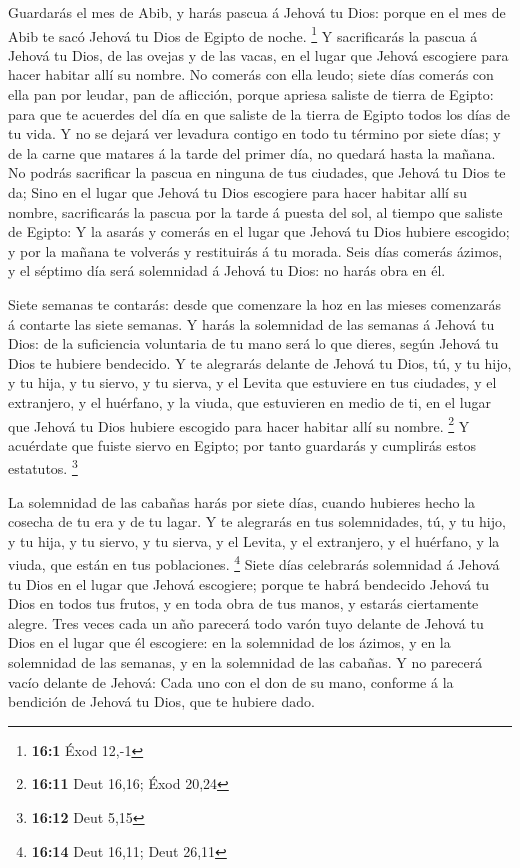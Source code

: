  Guardarás el mes de Abib, y harás pascua á Jehová tu Dios:
porque en el mes de Abib te sacó Jehová tu Dios de Egipto de noche.
\footnote{\textbf{16:1} Éxod 12,-1}  Y sacrificarás la
pascua á Jehová tu Dios, de las ovejas y de las vacas, en el lugar que
Jehová escogiere para hacer habitar allí su nombre.  No
comerás con ella leudo; siete días comerás con ella pan por leudar, pan
de aflicción, porque apriesa saliste de tierra de Egipto: para que te
acuerdes del día en que saliste de la tierra de Egipto todos los días de
tu vida.  Y no se dejará ver levadura contigo en todo tu
término por siete días; y de la carne que matares á la tarde del primer
día, no quedará hasta la mañana.  No podrás sacrificar la
pascua en ninguna de tus ciudades, que Jehová tu Dios te da;
 Sino en el lugar que Jehová tu Dios escogiere para hacer
habitar allí su nombre, sacrificarás la pascua por la tarde á puesta del
sol, al tiempo que saliste de Egipto:  Y la asarás y comerás
en el lugar que Jehová tu Dios hubiere escogido; y por la mañana te
volverás y restituirás á tu morada.  Seis días comerás
ázimos, y el séptimo día será solemnidad á Jehová tu Dios: no harás obra
en él.

 Siete semanas te contarás: desde que comenzare la hoz en
las mieses comenzarás á contarte las siete semanas.  Y
harás la solemnidad de las semanas á Jehová tu Dios: de la suficiencia
voluntaria de tu mano será lo que dieres, según Jehová tu Dios te
hubiere bendecido.  Y te alegrarás delante de Jehová tu
Dios, tú, y tu hijo, y tu hija, y tu siervo, y tu sierva, y el Levita
que estuviere en tus ciudades, y el extranjero, y el huérfano, y la
viuda, que estuvieren en medio de ti, en el lugar que Jehová tu Dios
hubiere escogido para hacer habitar allí su nombre. \footnote{\textbf{16:11}
  Deut 16,16; Éxod 20,24}  Y acuérdate que fuiste siervo en
Egipto; por tanto guardarás y cumplirás estos estatutos. \footnote{\textbf{16:12}
  Deut 5,15}

 La solemnidad de las cabañas harás por siete días, cuando
hubieres hecho la cosecha de tu era y de tu lagar.  Y te
alegrarás en tus solemnidades, tú, y tu hijo, y tu hija, y tu siervo, y
tu sierva, y el Levita, y el extranjero, y el huérfano, y la viuda, que
están en tus poblaciones. \footnote{\textbf{16:14} Deut 16,11; Deut
  26,11}  Siete días celebrarás solemnidad á Jehová tu Dios
en el lugar que Jehová escogiere; porque te habrá bendecido Jehová tu
Dios en todos tus frutos, y en toda obra de tus manos, y estarás
ciertamente alegre.  Tres veces cada un año parecerá todo
varón tuyo delante de Jehová tu Dios en el lugar que él escogiere: en la
solemnidad de los ázimos, y en la solemnidad de las semanas, y en la
solemnidad de las cabañas. Y no parecerá vacío delante de Jehová:
 Cada uno con el don de su mano, conforme á la bendición de
Jehová tu Dios, que te hubiere dado.

